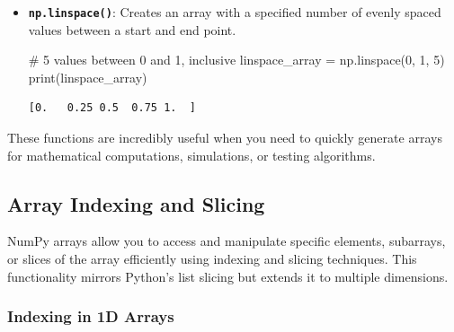 \documentclass[
  letterpaper,
  DIV=11,
  numbers=noendperiod]{scrreprt}
\newenvironment{Shaded}{\begin{snugshade}}{\end{snugshade}}
\newcommand{\BuiltInTok}[1]{\textcolor[rgb]{0.00,0.23,0.31}{#1}}
\newcommand{\CommentTok}[1]{\textcolor[rgb]{0.37,0.37,0.37}{#1}}
\newcommand{\DecValTok}[1]{\textcolor[rgb]{0.68,0.00,0.00}{#1}}
\newcommand{\NormalTok}[1]{\textcolor[rgb]{0.00,0.23,0.31}{#1}}
\newcommand{\OperatorTok}[1]{\textcolor[rgb]{0.37,0.37,0.37}{#1}}
\begin{document}
\begin{itemize}
\begin{Shaded}
\begin{Highlighting}[]
\CommentTok{\# Array with values [0, 2, 4, 6, 8]}
\NormalTok{range\_array }\OperatorTok{=}\NormalTok{ np.arange(}\DecValTok{0}\NormalTok{, }\DecValTok{10}\NormalTok{, }\DecValTok{2}\NormalTok{)  }
\BuiltInTok{print}\NormalTok{(range\_array)}
\end{Highlighting}
\end{Shaded}

\begin{verbatim}
[0 2 4 6 8]
\end{verbatim}
\item
  \textbf{\texttt{np.linspace()}}: Creates an array with a specified
  number of evenly spaced values between a start and end point.

\begin{Shaded}
\begin{Highlighting}[]
\CommentTok{\# 5 values between 0 and 1, inclusive}
\NormalTok{linspace\_array }\OperatorTok{=}\NormalTok{ np.linspace(}\DecValTok{0}\NormalTok{, }\DecValTok{1}\NormalTok{, }\DecValTok{5}\NormalTok{)  }
\BuiltInTok{print}\NormalTok{(linspace\_array)}
\end{Highlighting}
\end{Shaded}

\begin{verbatim}
[0.   0.25 0.5  0.75 1.  ]
\end{verbatim}
\end{itemize}

These functions are incredibly useful when you need to quickly generate
arrays for mathematical computations, simulations, or testing
algorithms.

\hypertarget{array-indexing-and-slicing}{%
\subsection{Array Indexing and
Slicing}\label{array-indexing-and-slicing}}

NumPy arrays allow you to access and manipulate specific elements,
subarrays, or slices of the array efficiently using indexing and slicing
techniques. This functionality mirrors Python's list slicing but extends
it to multiple dimensions.

\hypertarget{indexing-in-1d-arrays}{%
\subsubsection{Indexing in 1D Arrays}\label{indexing-in-1d-arrays}}
\end{document}
